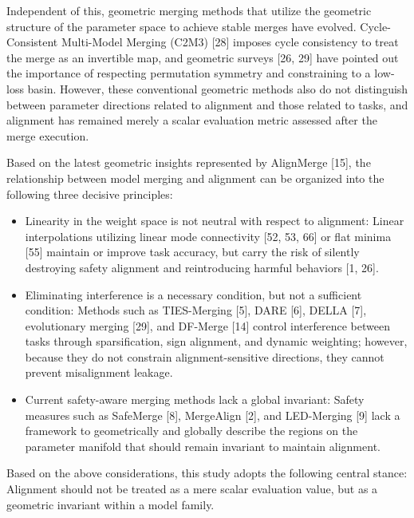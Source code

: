 \documentclass{article}
\begin{document}

Independent of this, geometric merging methods that utilize the geometric structure of the parameter space to achieve stable merges have evolved. Cycle-Consistent Multi-Model Merging (C2M3) [28] imposes cycle consistency to treat the merge as an invertible map, and geometric surveys [26, 29] have pointed out the importance of respecting permutation symmetry and constraining to a low-loss basin. However, these conventional geometric methods also do not distinguish between parameter directions related to alignment and those related to tasks, and alignment has remained merely a scalar evaluation metric assessed after the merge execution.

Based on the latest geometric insights represented by AlignMerge [15], the relationship between model merging and alignment can be organized into the following three decisive principles:

\begin{itemize}
\item Linearity in the weight space is not neutral with respect to alignment: Linear interpolations utilizing linear mode connectivity [52, 53, 66] or flat minima [55] maintain or improve task accuracy, but carry the risk of silently destroying safety alignment and reintroducing harmful behaviors [1, 26].
\item Eliminating interference is a necessary condition, but not a sufficient condition: Methods such as TIES-Merging [5], DARE [6], DELLA [7], evolutionary merging [29], and DF-Merge [14] control interference between tasks through sparsification, sign alignment, and dynamic weighting; however, because they do not constrain alignment-sensitive directions, they cannot prevent misalignment leakage.
\item Current safety-aware merging methods lack a global invariant: Safety measures such as SafeMerge [8], MergeAlign [2], and LED-Merging [9] lack a framework to geometrically and globally describe the regions on the parameter manifold that should remain invariant to maintain alignment.
\end{itemize}

Based on the above considerations, this study adopts the following central stance: Alignment should not be treated as a mere scalar evaluation value, but as a geometric invariant within a model family.
\end{document}
